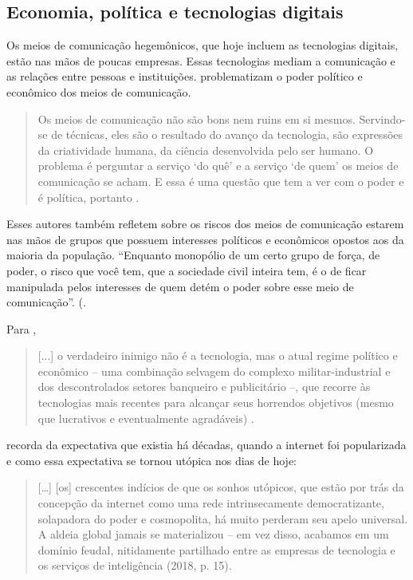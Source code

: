 \documentclass[portuguese]{textolivre}
\begin{document}
\subsection{Economia, política e tecnologias digitais}

Os meios de comunicação hegemônicos, que hoje incluem as tecnologias digitais, estão nas mãos de poucas empresas. Essas tecnologias mediam a comunicação e as relações entre pessoas e instituições. \textcite{freire_educar_2011} problematizam o poder político e econômico dos meios de comunicação.

\begin{quote}
 Os meios de comunicação não são bons nem ruins em si mesmos. Servindo-se de técnicas, eles são o resultado do avanço da tecnologia, são expressões da criatividade humana, da ciência desenvolvida pelo ser humano. O problema é perguntar a serviço ‘do quê’ e a serviço ‘de quem’ os meios de comunicação se acham. E essa é uma questão que tem a ver com o poder e é política, portanto \cite[p. 22]{freire_educar_2011}.
\end{quote}

Esses autores também refletem sobre os riscos dos meios de comunicação estarem nas mãos de grupos que possuem interesses políticos e econômicos opostos aos da maioria da população. “Enquanto monopólio de um certo grupo de força, de poder, o risco que você tem, que a sociedade civil inteira tem, é o de ficar manipulada pelos interesses de quem detém o poder sobre esse meio de comunicação”. (\textcite[p. 22]{freire_educar_2011}.

Para \textcite{morozov2018},

\begin{quote}
 [...] o verdadeiro inimigo não é a tecnologia, mas o atual regime político e econômico – uma combinação selvagem do complexo militar-industrial e dos descontrolados setores banqueiro e publicitário –, que recorre às tecnologias mais recentes para alcançar seus horrendos objetivos (mesmo que lucrativos e eventualmente agradáveis) \cite[p. 30]{morozov2018}.
\end{quote}

\textcite{morozov2018} recorda da expectativa que existia há décadas, quando a internet foi popularizada e como essa expectativa se tornou utópica nos dias de hoje:

\begin{quote}
 […] [os] crescentes indícios de que os sonhos utópicos, que estão por trás da concepção da internet como uma rede intrinsecamente democratizante, solapadora do poder e cosmopolita, há muito perderam seu apelo universal. A aldeia global jamais se materializou – em vez disso, acabamos em um domínio feudal, nitidamente partilhado entre as empresas de tecnologia e os serviços de inteligência (2018, p. 15).
\end{quote}
\end{document}
